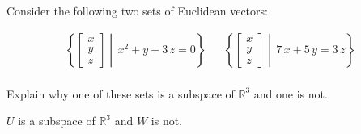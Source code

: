 
\begin{exerciseStatement}


Consider the following two sets of Euclidean vectors: 


\begin{align*}  \left\{ \left[\begin{array}{c}
x \\
y \\
z
\end{array}\right] \middle|\,x^{2} + y + 3 \, z = 0\right\}  & &   \left\{ \left[\begin{array}{c}
x \\
y \\
z
\end{array}\right] \middle|\,7 \, x + 5 \, y = 3 \, z\right\}  \\ \end{align*}
            

 Explain why one of these sets is a subspace of \(\mathbb{R}^ 3 \) and one is not. 


\end{exerciseStatement}
    
\begin{exerciseAnswer} 


\(U\) is a subspace of \(\mathbb{R}^ 3 \) and \(W\) is not.


\end{exerciseAnswer}
    
